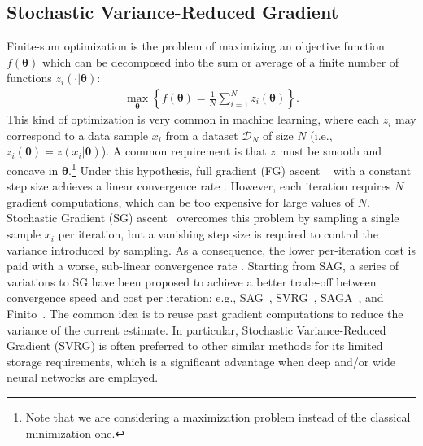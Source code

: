 \documentclass{article}
\makeatletter
\theoremstyle{remark}
\theoremstyle{definition}
\DeclareRobustCommand{\eg}{e.g.,\@\xspace}
\DeclareRobustCommand{\ie}{i.e.,\@\xspace}
\newcommand{\vtheta}{\boldsymbol{\theta}}
\makeatother
\begin{document}
\subsection{Stochastic Variance-Reduced Gradient}
Finite-sum optimization is the problem of maximizing an objective function $f(\vtheta)$ which can be decomposed into the sum or average of a finite number of functions $z_i(\cdot|\vtheta)$:
\begin{align*}
        \max_{\vtheta} \left\{ f(\vtheta) = \frac{1}{N}\sum_{i=1}^{N}z_i(\vtheta)\right\}.
\end{align*}
This kind of optimization is very common in machine learning, where each $z_i$ may correspond to a data sample $x_i$ from a dataset $\mathcal{D}_N$ of size $N$ (\ie $z_i(\vtheta) = z(x_i|\vtheta)$). 
A common requirement is that $z$ must be smooth and concave in $\vtheta$.\footnote{Note that we are considering a maximization problem instead of the classical minimization one.} 
Under this hypothesis, full gradient (FG) ascent ~\citep{cauchy1847methode} with a constant step size achieves a linear convergence rate \cite{nesterov2013introductory}.
However, each iteration requires $N$ gradient computations, which can be too expensive for large values of $N$. Stochastic Gradient (SG) ascent~\citep[\eg][]{robbins1951stochastic,bottou2004large} overcomes this problem by sampling a single sample $x_i$ per iteration, but a vanishing step size is required to control the variance introduced by sampling. As a consequence, the lower per-iteration cost is paid with a worse, sub-linear convergence rate \cite{nemirovskii1983problem}.
Starting from SAG, a series of variations to SG have been proposed to achieve a better trade-off between convergence speed and cost per iteration: \eg SAG~\citep{roux2012stochastic}, SVRG~\cite{johnson2013accelerating}, SAGA~\cite{defazio2014saga}, and Finito~\cite{defazio2014finito}. 
The common idea is to reuse past gradient computations to reduce the variance of the current estimate.
In particular, Stochastic Variance-Reduced Gradient (SVRG) is often preferred to other similar methods for its limited storage requirements, which is a significant advantage when deep and/or wide neural networks are employed.  
\end{document}
